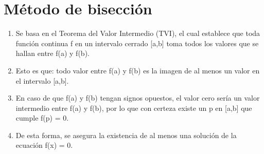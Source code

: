 


\section{Método de bisección}
\begin{enumerate}
 \item
   Se basa en el Teorema del Valor Intermedio (TVI), el cual establece que toda función continua f en un intervalo cerrado [a,b] toma todos los valores que se hallan entre f(a) y f(b). 
 \item
   Esto es que: todo valor entre f(a) y f(b) es la imagen de al menos un valor en el intervalo [a,b]. 
 \item
   En caso de que f(a) y f(b) tengan signos opuestos, el valor cero sería un valor intermedio entre f(a) y f(b), por lo que con certeza existe un p en [a,b] que cumple f(p) = 0. 
 \item
   De esta forma, se asegura la existencia de al menos una solución de la ecuación f(x) = 0.
\end{enumerate}


